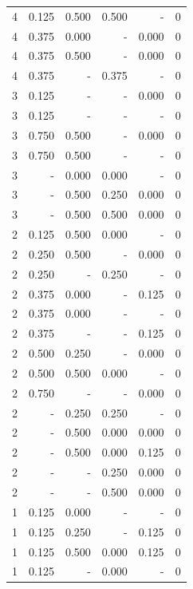 \documentclass[a4paper]{article}\usepackage[]{graphicx}\usepackage[]{color}
\begin{document}
\begin{table}[ht]
\begin{tabular}{rrrrrr}
   \rowcolor{goodColor} 4 & 0.125 & 0.500 & 0.500 & - & 0 \\ 
  4 & 0.375 & 0.000 & - & 0.000 & 0 \\ 
  4 & 0.375 & 0.500 & - & 0.000 & 0 \\ 
   \rowcolor{sosoColor} 4 & 0.375 & - & 0.375 & - & 0 \\ 
   \rowcolor{nullColor} 3 & 0.125 & - & - & 0.000 & 0 \\ 
   \rowcolor{nullColor} 3 & 0.125 & - & - & - & 0 \\ 
  3 & 0.750 & 0.500 & - & 0.000 & 0 \\ 
  3 & 0.750 & 0.500 & - & - & 0 \\ 
   \rowcolor{goodColor} 3 & - & 0.000 & 0.000 & - & 0 \\ 
   \rowcolor{badColor} 3 & - & 0.500 & 0.250 & 0.000 & 0 \\ 
   \rowcolor{goodColor} 3 & - & 0.500 & 0.500 & 0.000 & 0 \\ 
   \rowcolor{badColor} 2 & 0.125 & 0.500 & 0.000 & - & 0 \\ 
  2 & 0.250 & 0.500 & - & 0.000 & 0 \\ 
   \rowcolor{sosoColor} 2 & 0.250 & - & 0.250 & - & 0 \\ 
  2 & 0.375 & 0.000 & - & 0.125 & 0 \\ 
  2 & 0.375 & 0.000 & - & - & 0 \\ 
   \rowcolor{nullColor} 2 & 0.375 & - & - & 0.125 & 0 \\ 
  2 & 0.500 & 0.250 & - & 0.000 & 0 \\ 
   \rowcolor{badColor} 2 & 0.500 & 0.500 & 0.000 & - & 0 \\ 
   \rowcolor{nullColor} 2 & 0.750 & - & - & 0.000 & 0 \\ 
   \rowcolor{goodColor} 2 & - & 0.250 & 0.250 & - & 0 \\ 
   \rowcolor{badColor} 2 & - & 0.500 & 0.000 & 0.000 & 0 \\ 
   \rowcolor{badColor} 2 & - & 0.500 & 0.000 & 0.125 & 0 \\ 
   \rowcolor{sosoColor} 2 & - & - & 0.250 & 0.000 & 0 \\ 
   \rowcolor{sosoColor} 2 & - & - & 0.500 & 0.000 & 0 \\ 
  1 & 0.125 & 0.000 & - & - & 0 \\ 
  1 & 0.125 & 0.250 & - & 0.125 & 0 \\ 
   \rowcolor{badColor} 1 & 0.125 & 0.500 & 0.000 & 0.125 & 0 \\ 
   \rowcolor{sosoColor} 1 & 0.125 & - & 0.000 & - & 0 \\ 

\end{tabular}
\end{table}
\end{document}
